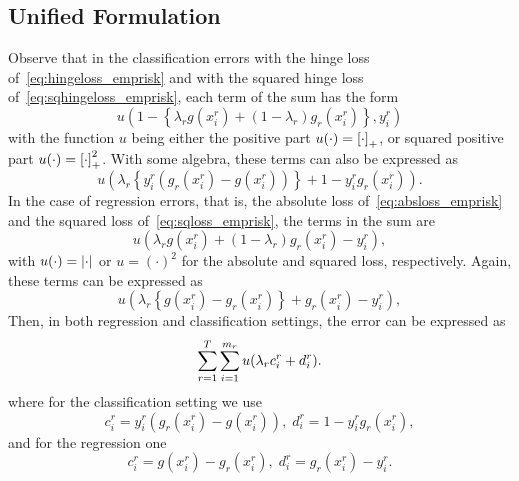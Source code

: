 \subsection{Unified Formulation}
Observe that in the classification errors with the hinge loss of~\eqref{eq:hingeloss_emprisk} and with the squared hinge loss of~\eqref{eq:sqhingeloss_emprisk}, each term of the sum has the form
\begin{equation}
    \nonumber
    u\left(1 - \left\{\lambda_r g(x_i^r) + (1-\lambda_r) g_r(x_i^r)  \right\} ,y_i^r\right)
\end{equation}
with the function $u$ being either the positive part $u(\cdot)=\left[\cdot\right]_{+}$, or squared positive part $u(\cdot)=\left[\cdot\right]_{+}^2$.
With some algebra, these terms can also be expressed as
\begin{equation}
    \nonumber
    u\left(\lambda_r \left\{ y_i^r (g_r(x_i^r) - g(x_i^r)) \right\} +  1 - y_i^r g_r(x_i^r) \right).
\end{equation}
In the case of regression errors, that is, the absolute loss of~\eqref{eq:absloss_emprisk} and the squared loss of~\eqref{eq:sqloss_emprisk}, the terms in the sum are
\begin{equation}
    \nonumber
    u\left(\lambda_r g(x_i^r) + (1-\lambda_r)g_r(x_i^r) - y_i^r\right) ,
\end{equation}
with $u(\cdot)=\left|\cdot\right|$ or $u=(\cdot)^2$ for the absolute and squared loss, respectively. Again, these terms can be expressed as 
\begin{equation}
    \nonumber
    u\left(\lambda_r \left\{ g(x_i^r) - g_r(x_i^r) \right\} +  g_r(x_i^r) - y_i^r \right) ,
\end{equation}
Then, in both regression and classification settings, the error can be expressed as
\begin{equation}
    \nonumber
    \sum_{r=1}^T \sum_{i=1}^{m_r} u(\lambda_r c_i^r + d_i^r) .
\end{equation}
where for the classification setting we use
\begin{equation}
    \label{eq:changevar_clas}
    c_i^r =  y_i^r (g_r(x_i^r) - g(x_i^r))  , \;  d_i^r =  1 - y_i^r g_r(x_i^r) ,
\end{equation}
and for the regression one\begin{equation}
    \label{eq:changevar_reg}
    c_i^r = g(x_i^r) - g_r(x_i^r)  , \;  d_i^r =  g_r(x_i^r) - y_i^r .
\end{equation}


